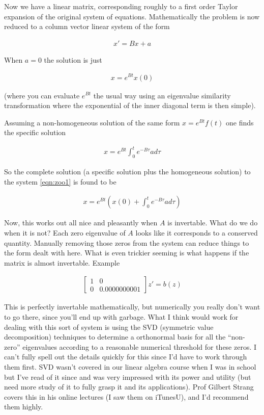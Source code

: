 Now we have a linear matrix, corresponding roughly to a first order Taylor expansion of the original system of equations.  Mathematically the problem is now reduced to a column vector linear system of the form

\begin{align}\label{eqn:zoo1}
x' = B x + a
\end{align}

When $a = 0$ the solution is just

\begin{align}
x = e^{B t} x(0)
\end{align}

(where you can evaluate $e^{Bt}$ the usual way using an eigenvalue similarity transformation where the exponential of the inner diagonal term is then simple).

Assuming a non-homogeneous solution of the same form $x = e^{B t} f(t)$ one finds the specific solution 

\begin{align}
x = e^{B t} \int_0^t e^{-B\tau} a d\tau
\end{align}

So the complete solution (a specific solution plus the homogeneous solution) to the system \ref{eqn:zoo1} is found to be

\begin{align}
x = e^{B t} \left( x(0) + \int_0^t e^{-B\tau} a d\tau \right)
\end{align}

Now, this works out all nice and pleasantly when $A$ is invertable.  What do we do when it is not?  Each zero eigenvalue of $A$ looks like it corresponds to a conserved quantity.  Manually removing those zeros from the system can reduce things to the form dealt with here.  What is even trickier seeming is what happens if the matrix is almost invertable.  Example

\begin{align}
\begin{bmatrix}
1 & 0 \\
0 & 0.0000000001
\end{bmatrix} z' = b(z)
\end{align}

This is perfectly invertable mathematically, but numerically you really don't want to go there, since you'll end up with garbage.  What I think would work for dealing with this sort of system is using the SVD (symmetric value decomposition) techniques to determine a orthonormal basis for all the ``non-zero'' eigenvalues according to a reasonable numerical threshold for these zeros.  I can't fully spell out the details quickly for this since I'd have to work through them first.  SVD wasn't covered in our linear algebra course when I was in school but I've read of it since and was very impressed with its power and utility (but need more study of it to fully grasp it and its applications).  Prof Gilbert Strang covers this in his online lectures (I saw them on iTunesU), and I'd recommend them highly.

\EndNoBibArticle
